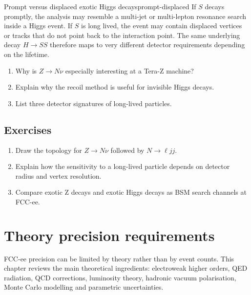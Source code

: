 \documentclass[11pt,a4paper]{article}
\numberwithin{equation}{section}
\begin{document}
\begin{examplebox}{Prompt versus displaced exotic Higgs decays}{prompt-displaced}
If \(S\) decays promptly, the analysis may resemble a multi-jet or multi-lepton resonance search inside a Higgs event. If \(S\) is long lived, the event may contain displaced vertices or tracks that do not point back to the interaction point. The same underlying decay \(H\to SS\) therefore maps to very different detector requirements depending on the lifetime.
\end{examplebox}

\begin{guidedchecksbox}
\begin{enumerate}[leftmargin=1.6em]
\item Why is \(Z\to N\nu\) especially interesting at a Tera-Z machine?
\item Explain why the recoil method is useful for invisible Higgs decays.
\item List three detector signatures of long-lived particles.
\end{enumerate}
\end{guidedchecksbox}

\subsection{Exercises}
\begin{enumerate}[leftmargin=1.6em]
\item Draw the topology for \(Z\to N\nu\) followed by \(N\to \ell jj\).
\item Explain how the sensitivity to a long-lived particle depends on detector radius and vertex resolution.
\item Compare exotic Z decays and exotic Higgs decays as BSM search channels at FCC-ee.
\end{enumerate}


\newpage
\section{Theory precision requirements}
\begin{guidelinebox}
FCC-ee precision can be limited by theory rather than by event counts. This chapter reviews the main theoretical ingredients: electroweak higher orders, QED radiation, QCD corrections, luminosity theory, hadronic vacuum polarisation, Monte Carlo modelling and parametric uncertainties.
\end{guidelinebox}
\end{document}
